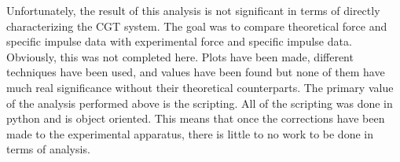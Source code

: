 Unfortunately, the result of this analysis is not significant in terms of directly characterizing the CGT system. The goal was to compare theoretical force and specific impulse data with experimental force and specific impulse data. Obviously, this was not completed here. Plots have been made, different techniques have been used, and values have been found but none of them have much real significance without their theoretical counterparts. The primary value of the analysis performed above is the scripting. All of the scripting was done in python and is object oriented. This means that once the corrections have been made to the experimental apparatus, there is little to no work to be done in terms of analysis.